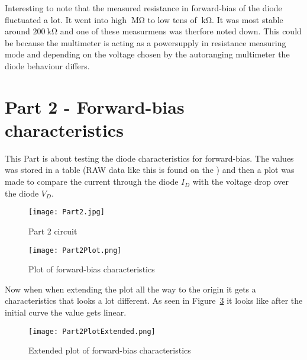 \documentclass{article}
\begin{document}
Interesting to note that the measured resistance in forward-bias of the diode fluctuated a lot. It went into high \(\SI{}{\mega\ohm}\) to low tens of \(\SI{}{\kilo\ohm}\). It was most stable around \(\SI{200}{\kilo\ohm}\) and one of these measurmens was therfore noted down. This could be because the multimeter is acting as a powersupply in resistance measuring mode and depending on the voltage chosen by the autoranging multimeter the diode behaviour differs.


\section{Part 2 - Forward-bias characteristics}
This Part is about testing the diode characteristics for forward-bias. The values was stored in a table (RAW data like this is found on the ) and then a plot was made to compare the current through the diode \(I_D\) with the voltage drop over the diode \(V_D\).


\begin{figure}[h]
    \centering
    \texttt{[image: Part2.jpg]}
    \caption{Part 2 circuit}
    \label{fig:Part2}
\end{figure}

\clearpage


\begin{figure}[h]
    \centering
    \texttt{[image: Part2Plot.png]}
    \caption{Plot of forward-bias characteristics}
    \label{fig:Part2Plot}
\end{figure}

Now when when extending the plot all the way to the origin it gets a characteristics that looks a lot different. As seen in Figure~\ref{fig:Part2PlotExtended} it looks like after the initial curve the value gets linear.

\clearpage


\begin{figure}[h]
    \centering
    \texttt{[image: Part2PlotExtended.png]}
    \caption{Extended plot of forward-bias characteristics}
    \label{fig:Part2PlotExtended}
\end{figure}
\end{document}
